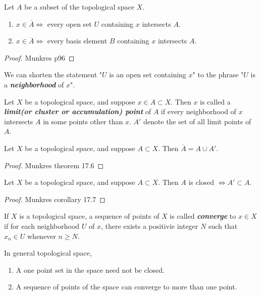 \begin{mytheorem}
Let $A$ be a subset of the topological space $X$. 
\begin{enumerate}[label={(\alph*)}]
\item $x\in \overline{A} \iff$ every open set $U$ containing $x$ intersects $A$.
\item $x\in \overline{A} \iff$ every basis element $B$ containing $x$ intersects $A$.
\end{enumerate}
\end{mytheorem}
\begin{proof}
Munkres p96
\end{proof}

\begin{notebox}
We can shorten the statement "$U$ is an open set containing $x$" to the phrase "$U$ is a \textbf{\emph{neighborhood}} of $x$".
\end{notebox}

\begin{mydefinition}
Let $X$ be a topological space, and suppose $x\in A\subset X$. Then $x$ is called a \textbf{\emph{limit(or cluster or accumulation) point}} of $A$ if every neighborhood of $x$ intersects $A$ in some points other than $x$. $A'$ denote the set of all limit points of $A$.
\end{mydefinition}

\begin{mytheorem}
Let $X$ be a topological space, and suppose $A\subset X$. Then $\overline{A}=A\cup A'$.
\end{mytheorem}
\begin{proof}
Munkres theorem 17.6
\end{proof}

\begin{mycorollary}
Let $X$ be a topological space, and suppose $A\subset X$. Then $A$ is closed $\iff A'\subset A$.
\end{mycorollary}
\begin{proof}
Munkres corollary 17.7 
\end{proof}

\begin{mydefinition}
If $X$ is a topological space, a sequence of points of $X$ is called 
\textbf{\emph{converge}} to $x\in X$ if for each neighborhood $U$ of $x$, there exists a positivie integer $N$ such that $x_n\in U$ whenever $n\geq N$. 
\end{mydefinition}

\begin{remark}
In general topological space,
\begin{enumerate}[label={(\alph*)}]
\item A one point set in the space need not be closed.
\item A sequence of points of the space can converge to more than one point.
\end{enumerate}
\end{remark}

